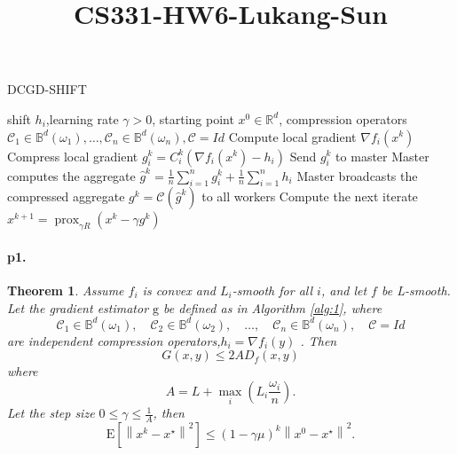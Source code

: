 \documentclass[12pt,a4paper]{article}
\title{CS331-HW6-Lukang-Sun}
\newtheorem*{theorem}{Theorem}
\begin{document}
	\maketitle
	\begin{algorithm}
		\caption{DCGD-SHIFT}
		\label{alg:1}
		\begin{algorithmic}[1]
			\REQUIRE shift $h_i$,learning rate $\gamma>0$, starting point $x^{0} \in \mathbb{R}^{d}$, compression operators $\mathcal{C}_{1} \in \mathbb{B}^{d}\left(\omega_{1}\right), \ldots, \mathcal{C}_{n} \in \mathbb{B}^{d}\left(\omega_{n}\right),\mathcal{C}=Id$
			\STATE Compute local gradient $\nabla f_{i}\left(x^{k}\right)$
			\STATE Compress local gradient $g_{i}^{k}={C}_{i}^{k}\left(\nabla f_{i}\left(x^{k}\right)-h_i\right)$
			\STATE Send $g_{i}^{k}$ to master
			\ENDFOR
			\STATE Master computes the aggregate $\hat{g}^{k}=\frac{1}{n} \sum_{i=1}^{n} g_{i}^{k}+\frac{1}{n}\sum_{i=1}^nh_i$ 
			\STATE Master broadcasts the compressed aggregate $g^{k}=\mathcal{C}(\hat{g}^{k})$ to all workers
			\STATE  Compute the next iterate $x^{k+1}=\operatorname{prox}_{\gamma R}\left(x^{k}-\gamma g^{k}\right)$
			\ENDFOR
			\ENDFOR
			
		\end{algorithmic}	 
	\end{algorithm}
	\paragraph{p1.}
	\begin{theorem}
	Assume $f_{i}$ is convex and $L_{i}$-smooth for all $i$, and let $f$ be L-smooth. Let the gradient estimator $\mathrm{g}$ be defined as in Algorithm \ref{alg:1}, where
	$$
	\mathcal{C}_{1} \in \mathbb{B}^{d}\left(\omega_{1}\right), \quad \mathcal{C}_{2} \in \mathbb{B}^{d}\left(\omega_{2}\right), \quad \ldots, \quad \mathcal{C}_{n} \in \mathbb{B}^{d}\left(\omega_{n}\right),\quad \mathcal{C} = Id
	$$
	are independent compression operators,$h_i=\nabla f_i(y)$ . Then
	$$
	G(x, y) \leq 2 A D_{f}(x, y)
	$$
	where
	$$
	A=L+ \max _{i}\left(L_{i} \frac{\omega_{i}}{n}\right).
	$$
	Let the step size $0\leq \gamma\leq \frac{1}{A}$, then
	\begin{equation}
	\mathrm{E}\left[\left\|x^{k}-x^{\star}\right\|^{2}\right] \leq(1-\gamma \mu)^{k}\left\|x^{0}-x^{\star}\right\|^{2}.
	\end{equation}

	\end{theorem}
\end{document}
